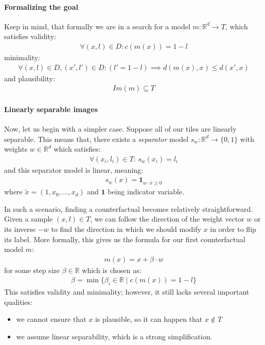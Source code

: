 \paragraph{Formalizing the goal}
Keep in mind, that formally we are in a search for a model $m : \mathbb{R}^{d} \to T$, which satisfies validity:
\begin{align*}
    \forall (x,l) \in D: c(m(x)) = 1 - l
\end{align*}
minimality:
\begin{align*}
    \forall (x, l) \in D, (x', l') \in D:  (l' = 1 - l) \implies d(m(x), x) \leq d(x', x)
\end{align*}
and plausibility:
\begin{align*}
    Im(m) \subseteq T
\end{align*}


\paragraph{Linearly separable images} Now, let us begin with a simpler case. Suppose all of our tiles are linearly separable. This means that, there exists a \emph{separator} model $s_w : \mathbb{R}^d \to \{0, 1\}$ with weights $w \in \mathbb{R}^d$ which satisfies:
\begin{align*}
    \forall (x_i, l_i) \in T:\, s_w(x_i) = l_i
\end{align*}
and this separator model is linear, meaning:
\begin{align*}
    s_w(x) = \textbf{1}_{w \cdot \tilde{x} \geq 0}
\end{align*}
where $\tilde{x} = (1, x_0, \dots, x_d)$ and $\textbf{1}$ being indicator variable.

In such a scenario, finding a counterfactual becomes relatively straightforward. Given a sample $(x, l) \in T$, we can follow the direction of the weight vector $w$ or its inverse $-w$ to find the direction in which we should modify $x$ in order to flip its label. More formally, this gives us the formula for our first counterfactual model $m$:
\begin{align*}
    m(x) = x + \beta \cdot w
\end{align*}
for some step size $\beta \in \mathbb{R}$ which is chosen as:
\begin{align*}
    \beta = \min \{ \beta_i \in \mathbb{R} \mid c(m(x)) = 1 - l\}
\end{align*}
This satisfies validity and minimality; however, it still lacks several important qualities:
\begin{itemize}
    \item we cannot ensure that $x$ is plausible, so it can happen that $x \notin T$
    \item we assume linear separability, which is a strong simplification.
\end{itemize}

